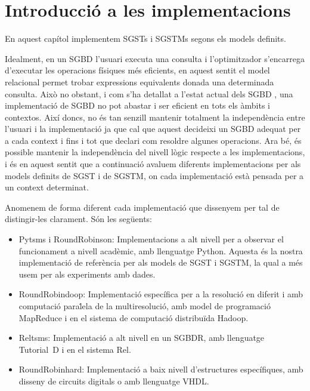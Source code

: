 

\chapter{Introducció a les implementacions}

En aquest capítol implementem \glspl{SGST} i \glspl{SGSTM} segons els
models definits.



Idealment, en un \gls{SGBD} l'usuari executa una consulta i
l'optimitzador s'encarrega d'executar les operacions físiques més
eficients, en aquest sentit el model relacional permet trobar
expressions equivalents donada una determinada consulta. Això no
obstant, i com s'ha detallat a l'estat actual dels \gls{SGBD}
, una implementació de \gls{SGBD} no pot abastar i ser
eficient en tots els àmbits i contextos. Així doncs, no és tan senzill
mantenir totalment la independència entre l'usuari i la implementació
ja que cal que aquest decideixi un \gls{SGBD} adequat per a cada
context i fins i tot que declari com resoldre algunes operacions.  Ara
bé, és possible mantenir la independència del nivell lògic respecte a
les implementacions, i és en aquest sentit que a continuació avaluem
diferents implementacions per als models definits de \gls{SGST} i de
\gls{SGSTM}, on cada implementació està pensada per a un context
determinat.


Anomenem de forma diferent cada implementació que dissenyem per tal de
distingir-les clarament. Són les següents:

\begin{itemize}
\item Pytsms i RoundRobinson: Implementacions a alt nivell per a
  observar el funcionament a nivell acadèmic, amb llenguatge
  Python. Aquesta és la nostra implementació de referència per als
  models de \gls{SGST} i \gls{SGSTM}, la qual a més usem per als
  experiments amb dades.

\item RoundRobindoop: Implementació específica per a la resolució en
  diferit i amb computació para\.lela de la multiresolució, amb model
  de programació MapReduce i en el sistema de computació distribuïda
  Hadoop.

\item Reltsms: Implementació a alt nivell en un \gls{SGBDR}, amb
  llenguatge Tutorial~D i en el sistema Rel.

\item RoundRobinhard: Implementació a baix nivell d'estructures
  específiques, amb disseny de circuits digitals o amb llenguatge
  VHDL. 



\end{itemize}




